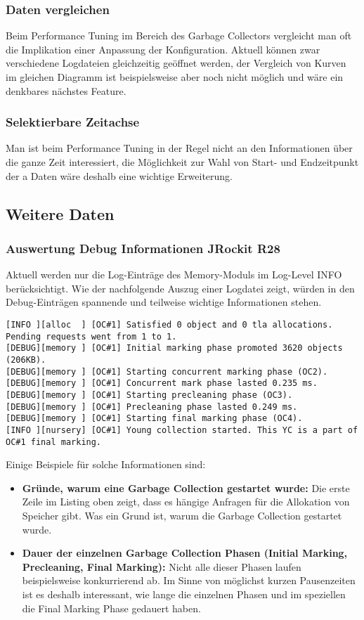 \subsubsection{Daten vergleichen}
Beim Performance Tuning im Bereich des Garbage Collectors vergleicht man oft die Implikation einer Anpassung der Konfiguration. Aktuell können zwar verschiedene Logdateien gleichzeitig geöffnet werden, der Vergleich von Kurven im gleichen Diagramm ist beispielsweise aber noch nicht möglich und wäre ein denkbares nächstes Feature.

\subsubsection{Selektierbare Zeitachse}
Man ist beim Performance Tuning in der Regel nicht an den Informationen über die ganze Zeit interessiert, die Möglichkeit zur Wahl von Start- und Endzeitpunkt der a Daten wäre deshalb eine wichtige Erweiterung.

\subsection{Weitere Daten}
\subsubsection{Auswertung Debug Informationen JRockit R28}\label{analyseumfang_jr28}
Aktuell werden nur die Log-Einträge des Memory-Moduls im Log-Level INFO berücksichtigt. Wie der nachfolgende Auszug einer Logdatei zeigt, würden in den Debug-Einträgen spannende und teilweise wichtige Informationen stehen.

\begin{lstlisting}[caption=Garbage Collection Log (Debug Informationen)]
[INFO ][alloc  ] [OC#1] Satisfied 0 object and 0 tla allocations. Pending requests went from 1 to 1.
[DEBUG][memory ] [OC#1] Initial marking phase promoted 3620 objects (206KB).
[DEBUG][memory ] [OC#1] Starting concurrent marking phase (OC2).
[DEBUG][memory ] [OC#1] Concurrent mark phase lasted 0.235 ms.
[DEBUG][memory ] [OC#1] Starting precleaning phase (OC3).
[DEBUG][memory ] [OC#1] Precleaning phase lasted 0.249 ms.
[DEBUG][memory ] [OC#1] Starting final marking phase (OC4).
[INFO ][nursery] [OC#1] Young collection started. This YC is a part of OC#1 final marking.
\end{lstlisting}

Einige Beispiele für solche Informationen sind:
\begin{itemize}
	\item \textbf{Gründe, warum eine Garbage Collection gestartet wurde:  }Die erste Zeile im Listing oben zeigt, dass es hängige Anfragen für die Allokation von Speicher gibt. Was ein Grund ist, warum die Garbage Collection gestartet wurde.
	\item \textbf{Dauer der einzelnen Garbage Collection Phasen (Initial Marking, Precleaning, Final Marking): } Nicht alle dieser Phasen laufen beispielsweise konkurrierend ab. Im Sinne von möglichst kurzen Pausenzeiten ist es deshalb interessant, wie lange die einzelnen Phasen und im speziellen die Final Marking Phase gedauert haben. 
\end{itemize}

